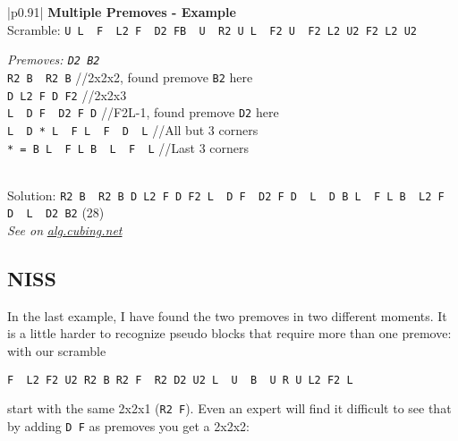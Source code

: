 \documentclass[11pt,a4paper]{book}
\newcommand{\p}{\textquotesingle}
\newcommand{\m}{\texttt}
\newcommand{\ps}{\p\,\,}
\newcommand{\comment}[1]{{\color{gray}\quad//#1}}
\begin{document}
\bigskip
\begin{tabular}{|p{}|}
\hline
\textbf{Multiple Premoves - Example}\\
\hline
Scramble: \m{U L\ps F\ps L2 F\ps D2 F\p B\ps U\ps R2 U L\ps F2 U\ps F2 L2 U2 F2 L2 U2}\\
\hline
\begin{minipage}[l]{0.650\textwidth}
\emph{Premoves: \m{D2 B2}}\\
\m{R2 B\ps R2 B} \comment{2x2x2, found premove \m{B2} here}\\
\m{D L2 F D F2} \comment{2x2x3}\\
\m{L\ps D F\ps D2 F D\p} \comment{F2L-1, found premove \m{D2} here}\\
\m{L\ps D * L\ps F L\ps F\ps D\ps L\p} \comment{All but 3 corners}\\
\m{* = B L\ps F L B\ps L\ps F\ps L} \comment{Last 3 corners}
\end{minipage}
\begin{minipage}[c]{0.25\textwidth}

\end{minipage}\\
\hline
Solution: \m{R2 B\ps R2 B D L2 F D F2 L\ps D F\ps D2 F D\ps L\ps D B L\ps F L B\ps L2 F\ps D\ps L\ps D2 B2} (28)\\
\hline
\emph{See on }\href{https://alg.cubing.net/?setup=D2_B2_U_L-_F-_L2_F-_D2_F-_B-_U-_R2_U_L-_F2_U-_F2_L2_U2_F2_L2_U2&alg=\%2F\%2FPremoves_already_added_to_the_scramble\%0AR2_B-_R2_B_\%2F\%2F2x2x2,_found_premove_B2_here\%0AD_L2_F_D_F2_\%2F\%2F2x2x3\%0AL-_D_F-_D2_F_D-_\%2F\%2FF2L\%26\%2345\%3B1,_found_premove_D2_here\%0AL-_D_(B_L-_F_L_B-_L-_F-_L)_L-_F_L-_F-_D-_L-_\%2F\%2FAll_but_3_corners}{\emph{alg.cubing.net}}\\
\hline
\end{tabular}
\bigskip

\subsection{NISS}

In the last example, I have found the two premoves in two different moments. It is a little harder to recognize pseudo blocks that require more than one premove: with our scramble

\begin{center}
\m{F\ps L2 F2 U2 R2 B R2 F\ps R2 D2 U2 L\ps U\ps B\ps U R U L2 F2 L\p}
\end{center}

start with the same 2x2x1 (\m{R2 F\p}). Even an expert will find it difficult to see that by adding \m{D F\p} as premoves you get a 2x2x2:
\end{document}
